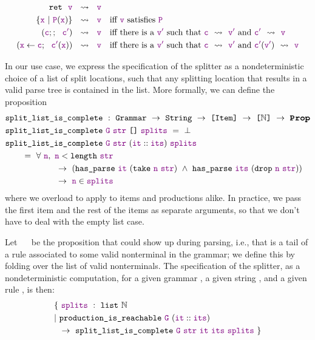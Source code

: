     \begin{align*}
      \texttt{ret}~~\textcolor{violet}{\texttt{v}}&~~\rightsquigarrow~~\textcolor{violet}{\texttt{v}} \\
      \{\textcolor{violet}{\texttt{x}}~|~\textcolor{violet}{\texttt{P}}(\textcolor{violet}{\texttt{x}})\}&~~\rightsquigarrow~~\textcolor{violet}{\texttt{v}}\quad\text{iff \textcolor{violet}{\texttt{v}} satisfies \textcolor{violet}{\texttt{P}}} \\
      (\textcolor{violet}{\texttt{c}};;~~\textcolor{violet}{\texttt{c$'$}})&~~\rightsquigarrow~~\textcolor{violet}{\texttt{v}}\quad\text{iff there is a \textcolor{violet}{\texttt{v$'$}} such that \textcolor{violet}{\texttt{c}}~~\ensuremath{\rightsquigarrow}~~\textcolor{violet}{\texttt{v$'$}} and \textcolor{violet}{\texttt{c$'$}}~~\ensuremath{\rightsquigarrow}~~\textcolor{violet}{\texttt{v}}} \\
      (\textcolor{violet}{\texttt{x}} \leftarrow \textcolor{violet}{\texttt{c}};~~\textcolor{violet}{\texttt{c$'$}}(\textcolor{violet}{\texttt{x}}))&~~\rightsquigarrow~~\textcolor{violet}{\texttt{v}}\quad\text{iff there is a \textcolor{violet}{\texttt{v$'$}} such that \textcolor{violet}{\texttt{c}}~~\ensuremath{\rightsquigarrow}~~\textcolor{violet}{\texttt{v$'$}} and \textcolor{violet}{\texttt{c$'$}}(\textcolor{violet}{\texttt{v$'$}})~~\ensuremath{\rightsquigarrow}~~\textcolor{violet}{\texttt{v}}}
    \end{align*}
    
    In our use case, we express the specification of the splitter as a nondeterministic choice of a list of split locations, such that any splitting location that results in a valid parse tree is contained in the list.  More formally, we can define the proposition
\begin{align*}
  &\fname{split\_list\_is\_complete} ~:~\indname{Grammar}~\to~\indname{String}~\to~\typelist{\indname{Item}}~\to~\typelist{\mathbb{N}}~\to~\Prop \\
  &\fname{split\_list\_is\_complete}~\farg{G}~\farg{str}~\nil~\farg{splits}~=~\False \\
  &\fname{split\_list\_is\_complete} ~\farg{G}~\farg{str}~(\cons{\farg{it}}{\farg{its}}) ~\farg{splits} \\
  &\qquad=~\forall~\farg{n},~\farg{n}<\fname{length}~\farg{str} \\
  &\qquad\qquad\qquad\to~(\fname{has\_parse}~\farg{it}~(\fname{take}~\farg{n}~\farg{str})~\wedge~\fname{has\_parse}~\farg{its}~(\fname{drop}~\farg{n}~\farg{str})) \\
  &\qquad\qquad\qquad\to~\farg{n}\in\farg{splits}
\end{align*}
    where we overload  to apply to items and productions alike.  In practice, we pass the first item and the rest of the items as separate arguments, so that we don't have to deal with the empty list case.
    
    Let ~~ be the proposition that  could show up during parsing, i.e., that  is a tail of a rule associated to some valid nonterminal in the grammar; we define this by folding over the list of valid nonterminals.  The specification of the splitter, as a nondeterministic computation, for a given grammar , a given string , and a given rule , is then:
\begin{align*}
& \{~\textcolor{violet}{\texttt{splits}}~:~\texttt{list}~{\mathbb{N}} \\
& |~\texttt{production\_is\_reachable}~\textcolor{violet}{\texttt{G}}~(\textcolor{violet}{\texttt{it}}::\textcolor{violet}{\texttt{its}})\\
&\phantom{|~}\to~\texttt{split\_list\_is\_complete}~\textcolor{violet}{\texttt{G}}~\textcolor{violet}{\texttt{str}}~\textcolor{violet}{\texttt{it}}~\textcolor{violet}{\texttt{its}}~\textcolor{violet}{\texttt{splits}}~\}
\end{align*}
    
